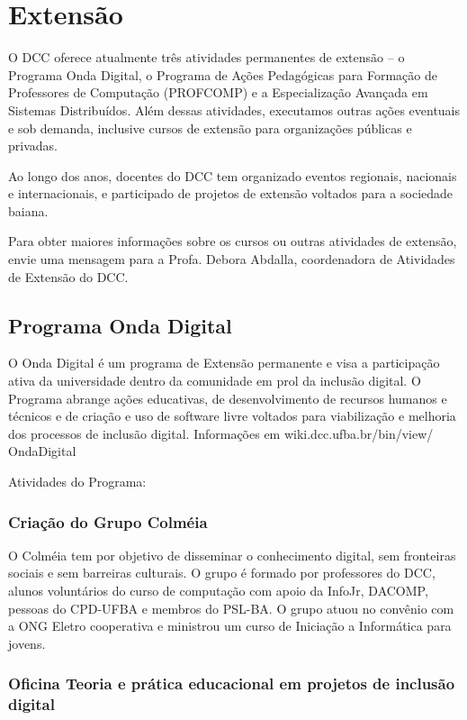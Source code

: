      
      
      \section{Extensão}
      
     O DCC oferece atualmente três atividades permanentes de extensão -- o Programa Onda Digital, o Programa de Ações Pedagógicas para Formação de Professores de Computação (PROFCOMP) e a Especialização Avançada em Sistemas Distribuídos. Além dessas atividades, executamos outras ações eventuais e sob demanda, inclusive cursos de extensão para organizações públicas e privadas. 
      
      Ao longo dos anos, docentes do DCC tem organizado eventos regionais, nacionais e internacionais, e participado de projetos de extensão voltados para a sociedade baiana. 
      
      Para obter maiores informações sobre os cursos ou outras atividades de extensão, envie uma mensagem para a Profa. Debora Abdalla, coordenadora de Atividades de Extensão do DCC. 
    
       \subsection{Programa Onda Digital}
      O Onda Digital é um programa de Extensão permanente e visa a participação ativa da universidade dentro da comunidade em prol da inclusão digital. O Programa abrange ações educativas, de desenvolvimento de recursos humanos e técnicos e de criação e uso de software livre voltados para viabilização e melhoria dos processos de inclusão digital. Informações em wiki.dcc.ufba.br/bin/view/
       OndaDigital
      
       Atividades do Programa: 
       
       
       \subsubsection*{Criação do Grupo Colméia} 
       O Colméia tem por objetivo de disseminar o conhecimento digital, sem fronteiras sociais e sem barreiras culturais. O grupo é formado por professores do DCC, alunos voluntários do curso de computação com apoio da InfoJr, DACOMP, pessoas do CPD-UFBA e membros do PSL-BA. O grupo atuou no convênio com a ONG Eletro cooperativa e ministrou um curso de Iniciação a Informática para jovens.
       
       \subsubsection*{Oficina Teoria e prática educacional em projetos de inclusão digital}
       
